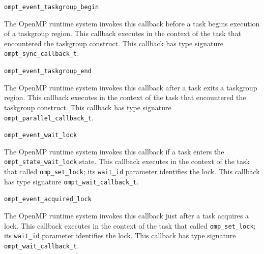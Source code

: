 \documentclass{article}
\newcommand{\descheader}[1]{{\needspace{3\baselineskip}\vspace{1em}\noindent \fbox{#1}}}
\begin{document}
\begin{description}
 
\item \verb|ompt_event_taskgroup_begin|

  The OpenMP runtime system invokes this callback before a task begins execution of a taskgroup region. This callback executes
  in the context of the task that encountered the taskgroup construct.
  This callback has type signature \verb|ompt_sync_callback_t|. 
 
\item \verb|ompt_event_taskgroup_end|

  The OpenMP runtime system invokes this callback after a task exits a taskgroup region.  This callback
  executes in the context of the task that encountered the taskgroup construct.
  This callback has type signature \verb|ompt_parallel_callback_t|. 

\end{description}

\descheader{Locks}

\begin{description}

\item \verb|ompt_event_wait_lock| 
 
   The OpenMP runtime system invokes this callback if a task
   enters the \verb|ompt_state_wait_lock| 
   state.  This callback executes in the context of the task that called \verb|omp_set_lock|;
   its \verb|wait_id| parameter identifies the lock.
   This callback has type signature \verb|ompt_wait_callback_t|. 

\item \verb|ompt_event_acquired_lock| 
 
   The OpenMP runtime system invokes this callback just after a
   task acquires a lock.  This callback executes in the
   context of the task that called \verb|omp_set_lock|; its \verb|wait_id| parameter identifies the  %
   lock.
   This callback  has type signature \verb|ompt_wait_callback_t|.

\end{description}

\descheader{Nest Locks}
\end{document}
